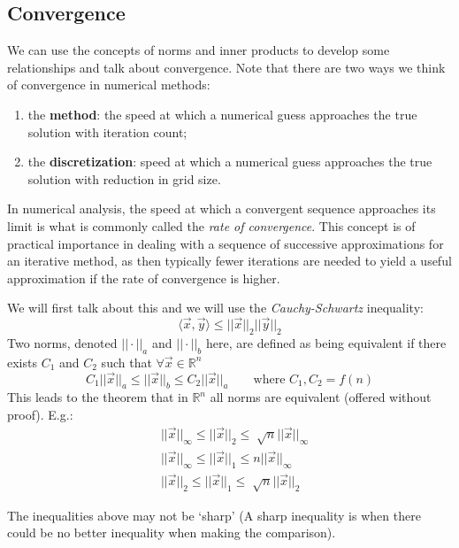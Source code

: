 \documentclass[12pt]{article}
\begin{document}
\subsection*{Convergence}
We can use the concepts of norms and inner products to develop some relationships and talk about convergence. Note that there are two ways we think of convergence in numerical methods:
\begin{enumerate}
\item the \textbf{method}: the speed at which a numerical guess approaches the true solution with iteration count;
\item the \textbf{discretization}: speed at which a numerical guess approaches the true solution with reduction in  grid size.
\end{enumerate}

In numerical analysis, the speed at which a convergent sequence approaches its limit is what is commonly called the \textit{rate of convergence}. This concept is of practical importance in dealing with a sequence of successive approximations for an iterative method, as then typically fewer iterations are needed to yield a useful approximation if the rate of convergence is higher. 

We will first talk about this and we will use the \textit{Cauchy-Schwartz} inequality:
%
\begin{equation}
\langle \vec{x}, \vec{y} \rangle \leq ||\vec{x}||_2 ||\vec{y}||_2 \nonumber
\end{equation}
%
Two norms, denoted $|| \cdot ||_a$ and $|| \cdot ||_b$ here, are defined as being equivalent if there exists $C_1$ and $C_2$ such that $\forall \vec{x} \in \mathbb{R}^n$
%
\begin{equation}
C_1 ||\vec{x}||_a \leq ||\vec{x}||_b \leq C_2 ||\vec{x}||_a \qquad \text{where } C_1, C_2 = f(n) \nonumber
\end{equation}
%
This leads to the theorem that in $\mathbb{R}^n$ all norms are equivalent (offered without proof). E.g.:
\begin{align}
& ||\vec{x}||_{\infty} \leq ||\vec{x}||_2 \leq \sqrt[]{n} ||\vec{x}||_{\infty} \nonumber \\
%
& ||\vec{x}||_{\infty} \leq ||\vec{x}||_1 \leq n ||\vec{x}||_{\infty} \nonumber \\
%
& ||\vec{x}||_2 \leq ||\vec{x}||_1 \leq \sqrt[]{n} ||\vec{x}||_2 \nonumber
\end{align}

The inequalities above may not be `sharp' (A sharp inequality is when there could be no better inequality when making the comparison). 
\end{document}
